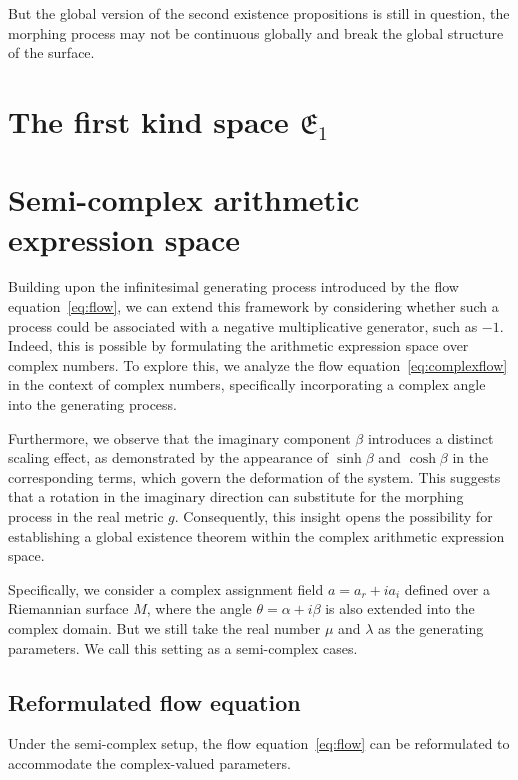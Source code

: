 \documentclass{article}
\numberwithin{definition}{section}
\numberwithin{lemma}{section}
\numberwithin{proposition}{section}
\numberwithin{corollary}{section}
\numberwithin{theorem}{section}
\begin{document}
But the global version of the second existence propositions is still in question, the morphing process may not be continuous globally and break the global structure of the surface.

\section{The first kind space $\mathfrak{E}_1$}\label{sec:firstkind}

\section{Semi-complex arithmetic expression space}\label{sec:complex}

Building upon the infinitesimal generating process introduced by the flow equation~\eqref{eq:flow},
we can extend this framework by considering whether such a process could be associated with a negative multiplicative generator, such as $-1$.
Indeed, this is possible by formulating the arithmetic expression space over complex numbers. To explore this,
we analyze the flow equation~\eqref{eq:complexflow} in the context of complex numbers, specifically incorporating a complex angle into the generating process.

Furthermore, we observe that the imaginary component $\beta$ introduces a distinct scaling effect,
as demonstrated by the appearance of $\sinh \beta$ and $\cosh \beta$ in the corresponding terms,
which govern the deformation of the system.
This suggests that a rotation in the imaginary direction can substitute for the morphing process in the real metric $g$.
Consequently, this insight opens the possibility for establishing a global existence theorem within the complex arithmetic expression space.

Specifically, we consider a complex assignment field $a = a_r + i a_i$ defined over a Riemannian surface $M$, where the angle $\theta = \alpha + i \beta$ is also extended into the complex domain.
But we still take the real number $\mu$ and $\lambda$ as the generating parameters. We call this setting as a semi-complex cases.

\subsection{Reformulated flow equation}\label{subsec:complex-flow}

Under the semi-complex setup, the flow equation~\eqref{eq:flow} can be reformulated to accommodate the complex-valued parameters.
\end{document}
